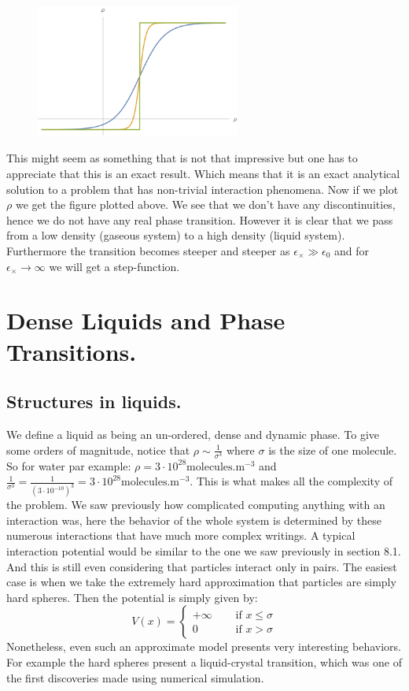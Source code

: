 \documentclass[10pt,a4paper]{book}
\begin{document}
\begin{figure}[h!]
\centering
\includegraphics[width=0.6\textwidth]{graphs/CappillaryTransition}
\end{figure}
This might seem as something that is not that impressive but one has to appreciate that this is an exact result. Which means that it is an exact analytical solution to a problem that has non-trivial interaction phenomena. Now if we plot $\rho$ we get the figure plotted above. We see that we don't have any discontinuities, hence we do not have any real phase transition. However it is clear that we pass from a low density (gaseous system) to a high density (liquid system). Furthermore the transition becomes steeper and steeper as $\epsilon_\times \gg \epsilon_0$ and for $\epsilon_\times \to \infty$ we will get a step-function. \vspace{10cm}

\section{Dense Liquids and Phase Transitions.}
\subsection{Structures in liquids.}
We define a liquid as being an un-ordered, dense and dynamic phase. To give some orders of magnitude, notice that $\rho \sim \frac{1}{\sigma^3}$ where $\sigma$ is the size of one molecule. So for water par example: $\rho = 3 \cdot 10^{28} \text{molecules}.\text{m}^{-3}$ and $\frac{1}{\sigma^3} = \frac{1}{(3 \cdot 10^{-10})^3} = 3 \cdot 10^{28} \text{molecules}.\text{m}^{-3}$. This is what makes all the complexity of the problem. We saw previously how complicated computing anything with an interaction was, here the behavior of the whole system is determined by these numerous interactions that have much more complex writings. A typical interaction potential would be similar to the one we saw previously in section 8.1. And this is still even considering that particles interact only in pairs.  The easiest case is when we take the extremely hard approximation that particles are simply hard spheres. Then the potential is simply given by:
\[
V(x) = \begin{cases}
+ \infty \quad &\text{ if } x \leq \sigma\\
0 \quad &\text{ if } x > \sigma
\end{cases}
\]
Nonetheless, even such an approximate model presents very interesting behaviors. For example the hard spheres present a liquid-crystal transition, which was one of the first discoveries made using numerical simulation.
\end{document}
